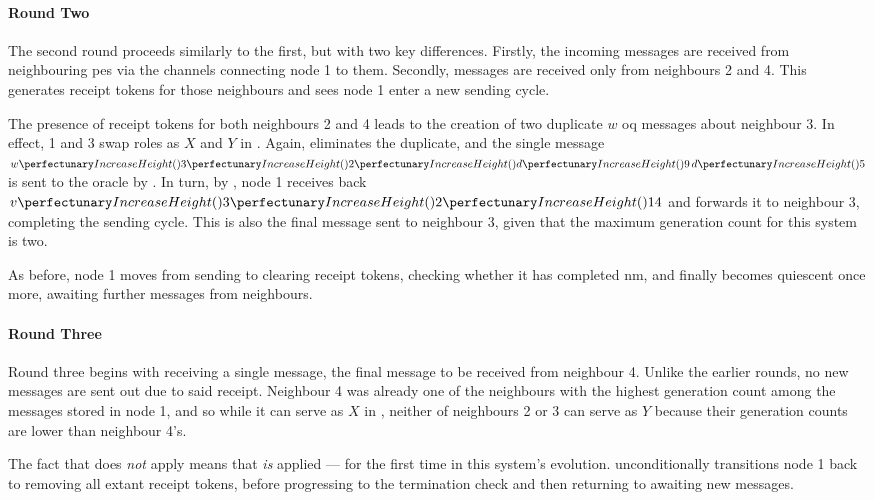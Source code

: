 \paragraph{Round Two}
The second round proceeds similarly to the first, but with two key differences.  Firstly, the incoming messages are received from neighbouring \glspl{pe} via the channels connecting node 1 to them.  Secondly, messages are received only from neighbours 2 and 4.  This generates receipt tokens for those neighbours and sees node 1 enter a new sending cycle.

The presence of receipt tokens for both neighbours 2 and 4 leads to the creation of two duplicate \(w\) \gls{oq} messages about neighbour 3.  In effect, 1 and 3 swap roles as \(X\) and \(Y\) in .  Again,  eliminates the duplicate, and the single message \(\cpvw{3}{2}{\cpfunc{d}{9} \, \cpfunc{d}{5}}\) is sent to the oracle by .  In turn, by , node 1 receives back \(\cpvv{3}{2}{14}\) and forwards it to neighbour 3, completing the sending cycle.  This is also the final message sent to neighbour 3, given that the maximum generation count for this system is two.

As before, node 1 moves from sending to clearing receipt tokens, checking whether it has completed \gls{nm}, and finally becomes quiescent once more, awaiting further messages from neighbours.

\paragraph{Round Three}
Round three begins with receiving a single message, the final message to be received from neighbour 4.  Unlike the earlier rounds, no new messages are sent out due to said receipt.  Neighbour 4 was already one of the neighbours with the highest generation count among the messages stored in node 1, and so while it can serve as \(X\) in , neither of neighbours 2 or 3 can serve as \(Y\) because their generation counts are lower than neighbour 4's.

The fact that  does \emph{not} apply means that  \emph{is} applied --- for the first time in this system's evolution.   unconditionally transitions node 1 back to removing all extant receipt tokens, before progressing to the termination check and then returning to awaiting new messages.

